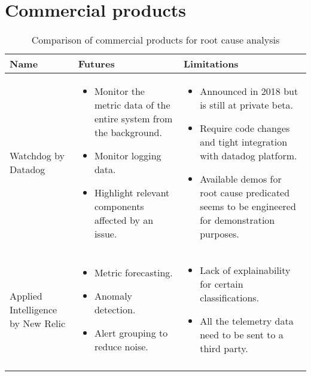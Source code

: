 \section{Commercial products}

\begin{longtable}{| p{4cm} | p{5.7cm} | p{5.7cm} |}
\hline
  \textbf{Name} &
  \textbf{Futures} &
  \textbf{Limitations} \\ \hline
  Watchdog by Datadog &
  \vspace{-8mm}
  \begin{itemize}[leftmargin=*,noitemsep,nolistsep] 
    \item Monitor the metric data of the entire system from the background.
    \item Monitor logging data.
    \item Highlight relevant components affected by an issue.
  \end{itemize} &
  \vspace{-8mm}
  \begin{itemize}[leftmargin=*,noitemsep,nolistsep] 
    \item Announced in 2018 but is still at private beta.
    \item Require code changes and tight integration with datadog platform.
    \item Available demos for root cause predicated seems to be engineered for demonstration purposes.
  \end{itemize} \\ \hline
  Applied Intelligence by New Relic &
  \vspace{-8mm}
  \begin{itemize}[leftmargin=*,noitemsep,nolistsep] 
    \item Metric forecasting.
    \item Anomaly detection.
    \item Alert grouping to reduce noise.
  \end{itemize} &
  \vspace{-8mm}
  \begin{itemize}[leftmargin=*,noitemsep,nolistsep] 
    \item Lack of explainability for certain classifications.
    \item All the telemetry data need to be sent to a third party.
  \end{itemize} \\ \hline
  \caption{Comparison of commercial products for root cause analysis}
\end{longtable}


